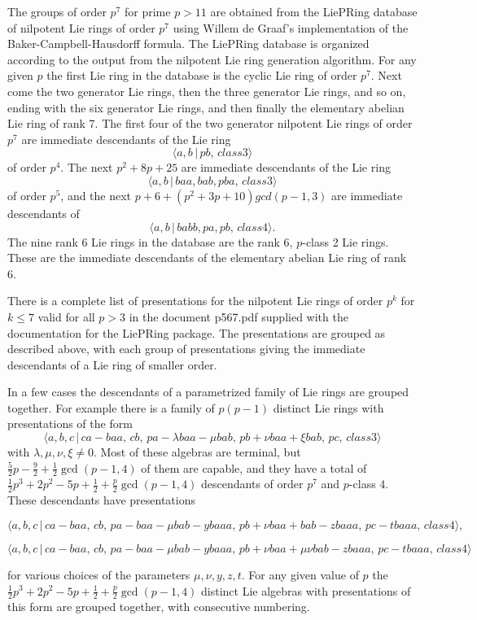 The groups of order $p^{7}$ for prime $p>11$ are obtained from the LiePRing
database of nilpotent Lie rings of order $p^{7}$ using Willem de Graaf's
implementation of the Baker-Campbell-Hausdorff formula. The LiePRing
database is organized according to the output from the nilpotent Lie ring
generation algorithm. For any given $p$ the first Lie ring in the database
is the cyclic Lie ring of order $p^{7}$. Next come the two generator Lie
rings, then the three generator Lie rings, and so on, ending with the six
generator Lie rings, and then finally the elementary abelian Lie ring of
rank 7. The first four of the two generator nilpotent Lie rings of order 
$p^{7}$ are immediate descendants of the Lie ring
$$
\langle a,b\,|\,pb,\,class 3\rangle 
$$
of order $p^{4}$. The next $p^{2}+8p+25$ are immediate descendants of the
Lie ring
$$
\langle a,b\,|\,baa,bab,pba,\,class 3\rangle 
$$
of order $p^{5}$, and the next $p+6+(p^{2}+3p+10) gcd(p-1,3)$ are immediate
descendants of
$$
\langle a,b\,|\,babb,pa,pb,\,class 4\rangle . 
$$
The nine rank 6 Lie rings in the database are the rank 6, $p$-class 2 
Lie rings. These are the immediate descendants of the elementary abelian 
Lie ring of rank 6.

There is a complete list of presentations for the nilpotent Lie rings of
order $p^{k}$ for $k\leq 7$ valid for all $p>3$ in the document p567.pdf
supplied with the documentation for the LiePRing package. The presentations
are grouped as described above, with each group of presentations giving the
immediate descendants of a Lie ring of smaller order.

In a few cases the descendants of a parametrized family of Lie rings are
grouped together. For example there is a family of $p(p-1)$ distinct Lie
rings with presentations of the form
$$
\langle a,b,c\,|\,ca-baa,\,cb,\,pa-\lambda baa-\mu bab,\,pb+\nu baa+\xi
bab,\,pc,\,class 3\rangle 
$$
with $\lambda ,\mu ,\nu ,\xi \neq 0$. Most of these algebras are terminal,
but $\frac{5}{2}p-\frac{9}{2}+\frac{1}{2}\gcd (p-1,4)$ of them are capable,
and they have a total of
$\frac{1}{2}p^{3}+2p^{2}-5p+\frac{1}{2}+\frac{p}{2}\gcd (p-1,4)$
descendants of order $p^{7}$ and $p$-class 4. These
descendants have presentations

$$
\langle a,b,c\,|\,ca-baa,\,cb,\,pa-baa-\mu bab-ybaaa,\,pb+\nu
baa+bab-zbaaa,\,pc-tbaaa,\,class 4\rangle , 
$$

$$
\langle a,b,c\,|\,ca-baa,\,cb,\,pa-baa-\mu bab-ybaaa,\,pb+\nu baa+\mu \nu
bab-zbaaa,\,pc-tbaaa,\,class 4\rangle 
$$

for various choices of the parameters $\mu ,\nu ,y,z,t$. For any given value
of $p$ the $\frac{1}{2}p^{3}+2p^{2}-5p+\frac{1}{2}+\frac{p}{2}\gcd (p-1,4)$
distinct Lie algebras with presentations of this form are grouped together,
with consecutive numbering.


